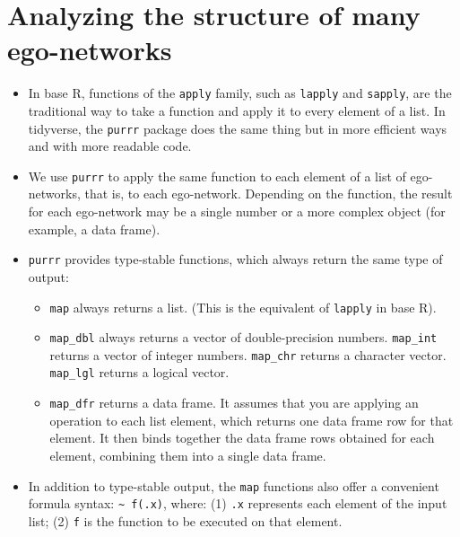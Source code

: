 \documentclass[
]{book}
\providecommand{\tightlist}{%
  \setlength{\itemsep}{0pt}\setlength{\parskip}{0pt}}
\begin{document}
\hypertarget{apply-purrr}{%
\section{Analyzing the structure of many ego-networks}\label{apply-purrr}}

\begin{itemize}
\tightlist
\item
  In base R, functions of the \texttt{apply} family, such as \texttt{lapply} and \texttt{sapply}, are the traditional way to take a function and apply it to every element of a list. In tidyverse, the \texttt{purrr} package does the same thing but in more efficient ways and with more readable code.
\item
  We use \texttt{purrr} to apply the same function to each element of a list of ego-networks, that is, to each ego-network. Depending on the function, the result for each ego-network may be a single number or a more complex object (for example, a data frame).
\item
  \texttt{purrr} provides type-stable functions, which always return the same type of output:

  \begin{itemize}
  \tightlist
  \item
    \texttt{map} always returns a list. (This is the equivalent of \texttt{lapply} in base R).
  \item
    \texttt{map\_dbl} always returns a vector of double-precision numbers. \texttt{map\_int} returns a vector of integer numbers. \texttt{map\_chr} returns a character vector. \texttt{map\_lgl} returns a logical vector.
  \item
    \texttt{map\_dfr} returns a data frame. It assumes that you are applying an operation to each list element, which returns one data frame row for that element. It then binds together the data frame rows obtained for each element, combining them into a single data frame.
  \end{itemize}
\item
  In addition to type-stable output, the \texttt{map} functions also offer a convenient formula syntax: \texttt{\textasciitilde{}\ f(.x)}, where: (1) \texttt{.x} represents each element of the input list; (2) \texttt{f} is the function to be executed on that element.


\end{itemize}
\end{document}
